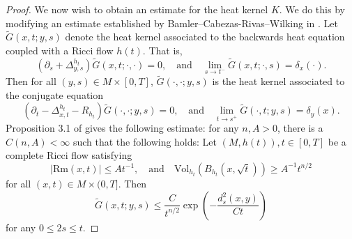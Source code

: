 \documentclass[12pt]{amsart}
\theoremstyle{plain}
\theoremstyle{plain}
\theoremstyle{definition}
\theoremstyle{remark}
\numberwithin{equation}{subsection}
\begin{document}
\begin{proof}
    We now wish to obtain an estimate for the heat kernel $K$. We do this by modifying an estimate established by Bamler--Cabezas-Rivas--Wilking in \cite{bamler_ricci_2017}. Let $\widetilde{G}(x,t;y,s)$ denote the heat kernel associated to the backwards heat equation coupled with a Ricci flow $h(t)$. That is,
    \begin{equation*}
        \left(\partial_s + \Delta^{h_t}_{y,s}\right)\widetilde{G}(x,t;\cdot,\cdot) = 0,\quad \text{and} \quad \lim\limits_{s\to t^-}\widetilde{G}(x,t;\cdot,s) = \delta_x(\cdot).
    \end{equation*}
    Then for all $(y,s) \in M \times [0,T]$, $\widetilde{G}(\cdot,\cdot;y,s)$ is the heat kernel associated to the conjugate equation
    \begin{equation*}
        \left(\partial_t - \Delta^{h_t}_{x,t} - R_{h_t}\right)\widetilde{G}(\cdot,\cdot;y,s) = 0,\quad \text{and} \quad \lim\limits_{t\to s^+}\widetilde{G}(\cdot,t;y,s) = \delta_y(x).
    \end{equation*}
    Proposition 3.1 of \cite{bamler_ricci_2017} gives the following estimate: for any $n, A > 0$, there is a $C(n,A) < \infty$ such that the following holds: Let $(M, h(t)), t\in[0,T]$ be a complete Ricci flow satisfying
    \begin{equation}\label{eqn:BCW-estimate-heat-kernel-assumptions}
        |\text{Rm}(x,t)| \leq At^{-1},\quad \text{and} \quad \text{Vol}_{h_t}\left(B_{h_t}(x,\sqrt{t})\right) \geq A^{-1}t^{n/2}
    \end{equation}
    for all $(x,t)\in M\times(0,T]$. Then
    \begin{equation}\label{eqn:BCW-estimate}
        \widetilde{G}(x,t;y,s) \leq \frac{C}{t^{n/2}}\exp{\left(-\frac{d^2_s(x,y)}{Ct}\right)}
    \end{equation}
    for any $0 \leq 2s \leq t$. 
    

\end{proof}
\end{document}
